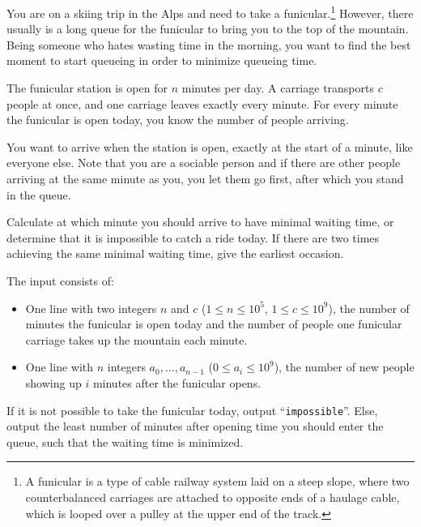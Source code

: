 

\newcommand{\maxa}{10^9}
\newcommand{\maxn}{10^5}
\newcommand{\maxc}{10^9}

You are on a skiing trip in the Alps and need to take a funicular.\footnote{%
    A funicular is a type of cable railway system laid on a steep slope,
    where two counterbalanced carriages are attached to opposite ends of a haulage cable,
    which is looped over a pulley at the upper end of the track.
}
However, there usually is a long queue for the funicular to bring you to the top of the mountain.
Being someone who hates wasting time in the morning,
you want to find the best moment to start queueing in order to minimize queueing time.

The funicular station is open for \(n\) minutes per day.
A carriage transports \(c\) people at once, and one carriage leaves exactly every minute.
For every minute the funicular is open today, you know the number of people arriving.

You want to arrive when the station is open, exactly at the start of a minute, like everyone else.
Note that you are a sociable person and if there are other people arriving at the same minute as you,
you let them go first, after which you stand in the queue.

Calculate at which minute you should arrive to have minimal waiting time,
or determine that it is impossible to catch a ride today.
If there are two times achieving the same minimal waiting time, give the earliest occasion.

\begin{Input}
    The input consists of:
    \begin{itemize}
		\item One line with two integers \(n\) and \(c\) (\(1 \leq n \leq \maxn\), \(1 \leq c \leq \maxc\)),
            the number of minutes the funicular is open today and
            the number of people one funicular carriage takes up the mountain each minute.
		\item One line with \(n\) integers \(a_0, \dots, a_{n-1}\) (\(0 \leq a_i \leq \maxa\)),
            the number of new people showing up \(i\) minutes after the funicular opens.
    \end{itemize}
\end{Input}

\begin{Output}
    If it is not possible to take the funicular today, output ``\texttt{impossible}''.
    Else, output the least number of minutes after opening time you should enter the queue,
    such that the waiting time is minimized.
\end{Output}
